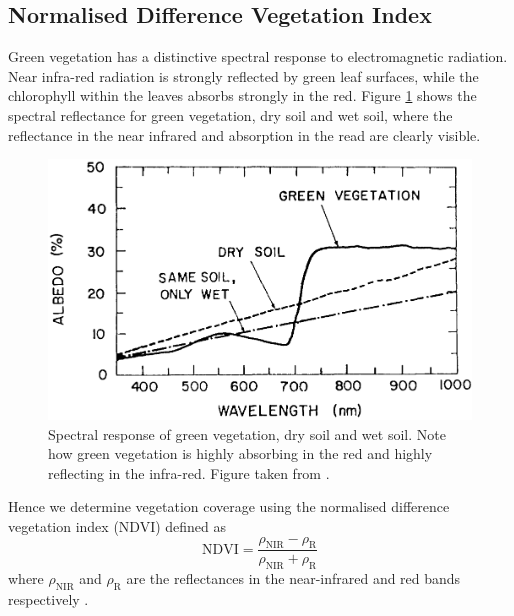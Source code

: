 \subsection{Normalised Difference Vegetation Index}
\label{sec:intro:ndvi}
Green vegetation has a distinctive spectral response to electromagnetic
radiation. Near infra-red radiation is strongly reflected by green leaf
surfaces, while the chlorophyll within the leaves absorbs strongly in the
red. Figure \ref{fig:leaf_spec} shows the spectral reflectance for green
vegetation, dry soil and wet soil, where the reflectance in the near infrared
and absorption in the read are clearly visible.
\begin{figure}
  \centering
  \includegraphics[width=0.9\linewidth]{figures/leaf_spec}
  \caption{Spectral response of green vegetation, dry soil and wet soil. Note how green vegetation is highly absorbing in the red and highly reflecting in the infra-red. Figure taken from \cite{tucker1977}.}
  \label{fig:leaf_spec}
\end{figure}
Hence we determine vegetation coverage using the normalised difference
vegetation index (NDVI) defined as
\begin{equation}
  \mathrm{NDVI} = \frac{\rho_{\mathrm{NIR}}-\rho_{\mathrm{R}}}{\rho_{\mathrm{NIR}}+\rho_{\mathrm{R}}}
  \label{eq:ndvi}
\end{equation}
where $\rho_{\mathrm{NIR}}$ and $\rho_{\mathrm{R}}$ are the reflectances in the
near-infrared and red bands respectively \citep{tucker1979}.

